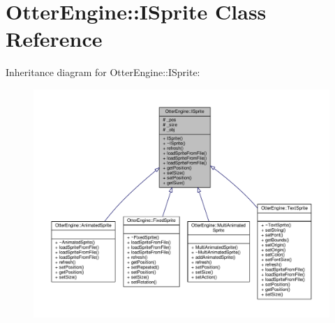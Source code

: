\hypertarget{class_otter_engine_1_1_i_sprite}{}\section{Otter\+Engine\+:\+:I\+Sprite Class Reference}
\label{class_otter_engine_1_1_i_sprite}


Inheritance diagram for Otter\+Engine\+:\+:I\+Sprite\+:\nopagebreak
\begin{figure}[H]
\begin{center}
\leavevmode
\includegraphics[width=350pt]{dc/df7/class_otter_engine_1_1_i_sprite__inherit__graph}
\end{center}
\end{figure}


